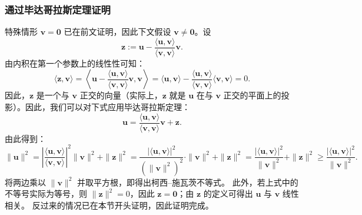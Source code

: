 \subsubsection{通过毕达哥拉斯定理证明}
特殊情形 $\mathbf{v} = \mathbf{0}$ 已在前文证明，因此下文假设 $\mathbf{v} \neq \mathbf{0}$。设
$$
\mathbf{z} := \mathbf{u} - \frac{\langle \mathbf{u}, \mathbf{v} \rangle}{\langle \mathbf{v}, \mathbf{v} \rangle} \mathbf{v}.~
$$
由内积在第一个参数上的线性性可知：
$$
\langle \mathbf{z}, \mathbf{v} \rangle = \left\langle \mathbf{u} - \frac{\langle \mathbf{u}, \mathbf{v} \rangle}{\langle \mathbf{v}, \mathbf{v} \rangle} \mathbf{v}, \mathbf{v} \right\rangle = \langle \mathbf{u}, \mathbf{v} \rangle - \frac{\langle \mathbf{u}, \mathbf{v} \rangle}{\langle \mathbf{v}, \mathbf{v} \rangle} \langle \mathbf{v}, \mathbf{v} \rangle = 0.~
$$
因此，$\mathbf{z}$ 是一个与 $\mathbf{v}$ 正交的向量（实际上，$\mathbf{z}$ 就是 $\mathbf{u}$ 在与 $\mathbf{v}$ 正交的平面上的投影）。因此，我们可以对下式应用毕达哥拉斯定理：
$$
\mathbf{u} = \frac{\langle \mathbf{u}, \mathbf{v} \rangle}{\langle \mathbf{v}, \mathbf{v} \rangle} \mathbf{v} + \mathbf{z}.~
$$
由此得到：
$$
\|\mathbf{u}\|^{2} = \left| \frac{\langle \mathbf{u}, \mathbf{v} \rangle}{\langle \mathbf{v}, \mathbf{v} \rangle} \right|^{2} \|\mathbf{v}\|^{2} + \|\mathbf{z}\|^{2} = \frac{|\langle \mathbf{u}, \mathbf{v} \rangle|^{2}}{(\|\mathbf{v}\|^{2})^{2}} \cdot \|\mathbf{v}\|^{2} + \|\mathbf{z}\|^{2} = \frac{|\langle \mathbf{u}, \mathbf{v} \rangle|^{2}}{\|\mathbf{v}\|^{2}} + \|\mathbf{z}\|^{2} \geq \frac{|\langle \mathbf{u}, \mathbf{v} \rangle|^{2}}{\|\mathbf{v}\|^{2}}.~
$$
将两边乘以 $\|\mathbf{v}\|^{2}$ 并取平方根，即得出柯西–施瓦茨不等式。
此外，若上式中的不等号实际为等号，则 $\|\mathbf{z}\|^{2} = 0$，因此 $\mathbf{z} = \mathbf{0}$；由 $\mathbf{z}$ 的定义可得出 $\mathbf{u}$ 与 $\mathbf{v}$ 线性相关。
反过来的情况已在本节开头证明，因此证明完成。
